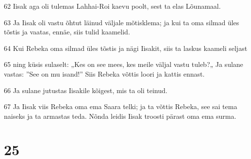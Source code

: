 \par 62 Iisak aga oli tulemas Lahhai-Roi kaevu poolt, sest ta elas Lõunamaal.
\par 63 Ja Iisak oli vastu õhtut läinud väljale mõtisklema; ja kui ta oma silmad üles tõstis ja vaatas, ennäe, siis tulid kaamelid.
\par 64 Kui Rebeka oma silmad üles tõstis ja nägi Iisakit, siis ta laskus kaameli seljast
\par 65 ning küsis sulaselt: „Kes on see mees, kes meile väljal vastu tuleb?„ Ja sulane vastas: ”See on mu isand!” Siis Rebeka võttis loori ja kattis ennast.
\par 66 Ja sulane jutustas Iisakile kõigest, mis ta oli teinud.
\par 67 Ja Iisak viis Rebeka oma ema Saara telki; ja ta võttis Rebeka, see sai tema naiseks ja ta armastas teda. Nõnda leidis Iisak troosti pärast oma ema surma.

\chapter{25}


